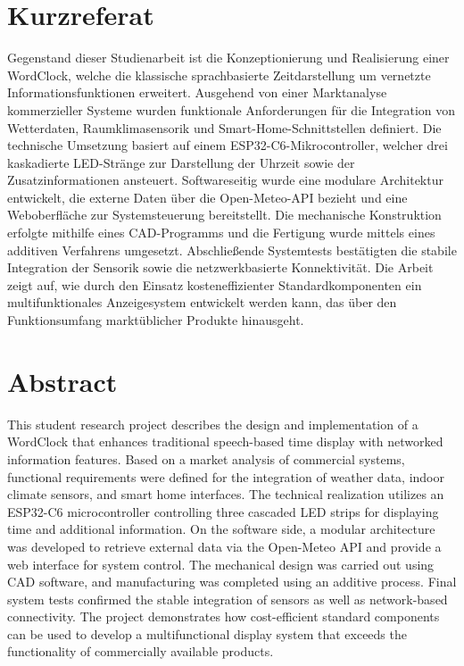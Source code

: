 \chapter*{Kurzreferat}
Gegenstand dieser Studienarbeit ist die Konzeptionierung und Realisierung einer WordClock, welche die klassische sprachbasierte Zeitdarstellung um vernetzte Informationsfunktionen erweitert.
Ausgehend von einer Marktanalyse kommerzieller Systeme wurden funktionale Anforderungen für die Integration von Wetterdaten, Raumklimasensorik und Smart-Home-Schnittstellen definiert.
Die technische Umsetzung basiert auf einem ESP32-C6-Mikrocontroller, welcher drei kaskadierte LED-Stränge zur Darstellung der Uhrzeit sowie der Zusatzinformationen ansteuert.
Softwareseitig wurde eine modulare Architektur entwickelt, die externe Daten über die Open-Meteo-API bezieht und eine Weboberfläche zur Systemsteuerung bereitstellt.
Die mechanische Konstruktion erfolgte mithilfe eines CAD-Programms und die Fertigung wurde mittels eines additiven Verfahrens umgesetzt.
Abschließende Systemtests bestätigten die stabile Integration der Sensorik sowie die netzwerkbasierte Konnektivität.
Die Arbeit zeigt auf, wie durch den Einsatz kosteneffizienter Standardkomponenten ein multifunktionales Anzeigesystem entwickelt werden kann, das über den Funktionsumfang marktüblicher Produkte hinausgeht.

\vspace{1cm}

\chapter*{Abstract}
This student research project describes the design and implementation of a WordClock that enhances traditional speech-based time display with networked information features.
Based on a market analysis of commercial systems, functional requirements were defined for the integration of weather data, indoor climate sensors, and smart home interfaces.
The technical realization utilizes an ESP32-C6 microcontroller controlling three cascaded LED strips for displaying time and additional information.
On the software side, a modular architecture was developed to retrieve external data via the Open-Meteo API and provide a web interface for system control.
The mechanical design was carried out using CAD software, and manufacturing was completed using an additive process.
Final system tests confirmed the stable integration of sensors as well as network-based connectivity.
The project demonstrates how cost-efficient standard components can be used to develop a multifunctional display system that exceeds the functionality of commercially available products.